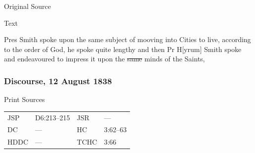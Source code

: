 				
				\begin{description}
					\item[Original Source]
				\end{description}
				
				
				\begin{description}
					\item[Text]
				\end{description}
				
					Pres Smith spoke upon the same subject of mooving into Cities to live, according to the order of God, he spoke quite lengthy and then Pr H[yrum] Smith spoke and endeavoured to impress it upon the \sout{same} minds of the Saints,
					
		\subsubsection{Discourse, 12 August 1838}
			\label{EMS-1838-JS-12-JUL-1838}
			
			\begin{description}
					\item[Print Sources]
				\end{description}

					\begin{tabular}{p{0.5in}p{1in}p{0.5in}p{1in}}
					JSP	 	& D6:213--215		& JSR 		& --- \\
					DC	 	& ---		& HC 		& 3:62--63 \\
					HDDC 	& ---		& TCHC 		& 3:66 \\
					\end{tabular}
				

